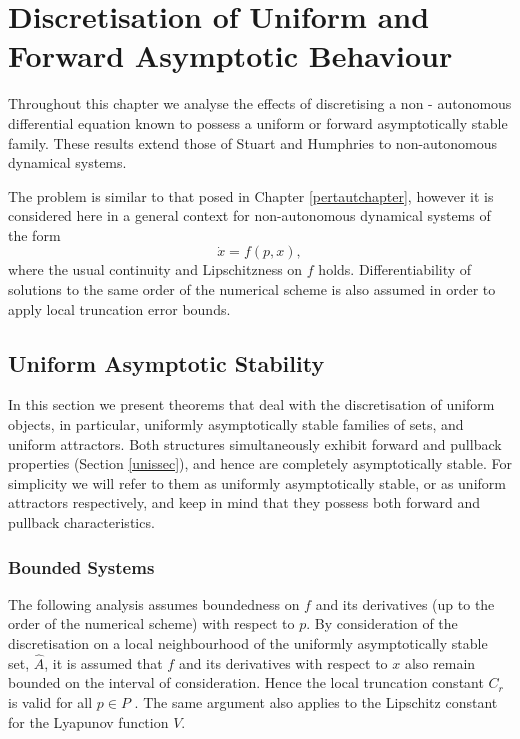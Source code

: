 \chapter[Numerical Approximation - I]
         {Discretisation of Uniform and Forward Asymptotic Behaviour}
\label{Discsec}

Throughout this chapter we analyse the effects of discretising a
non - autonomous differential equation known to possess a uniform or forward
asymptotically stable family. These results extend those of Stuart and
Humphries \cite{St94,StHu96} to non-autonomous dynamical systems.

The problem is similar to that posed in Chapter \ref{pertautchapter}, however it
is considered here in a general context for non-autonomous dynamical systems of
the form \[ \dot{x} = f( p, x), \]
where the usual continuity and Lipschitzness on $f$ holds.
Differentiability of solutions to the same order of the numerical
scheme is also assumed in order to apply local truncation error
bounds.

\section{Uniform Asymptotic Stability}
\label{Discsecuas}

In this section we present theorems that deal with the
discretisation of uniform objects, in particular, uniformly
asymptotically stable families of sets, and uniform attractors.
Both structures simultaneously exhibit forward and pullback
properties (Section \ref{unissec}), and hence are completely
asymptotically stable. For simplicity we will refer to them as
uniformly asymptotically stable, or as uniform attractors
respectively, and keep in mind that they possess both forward and
pullback characteristics.

\subsection{Bounded Systems}

The following analysis assumes boundedness on $f$ and its
derivatives (up to the order of the numerical scheme) with respect
to $p$. By consideration of the discretisation on a local
neighbourhood of the uniformly asymptotically stable set,
$\hat{A}$,  it is assumed that $f$ and its derivatives with
respect to $x$ also remain bounded on the interval of consideration.
Hence the local truncation constant $C_r$ is valid for all $p \in
P$ . The same argument also applies to the Lipschitz constant for
the Lyapunov function $V$.

